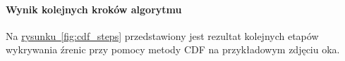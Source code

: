 \paragraph{Wynik kolejnych kroków algorytmu}
Na \hyperref[{fig:cdf_steps}]{rysunku~\ref{fig:cdf_steps}} przedstawiony jest rezultat kolejnych etapów wykrywania źrenic przy pomocy metody CDF na przykładowym zdjęciu oka.

